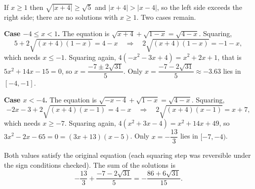 If $x\ge1$ then $\sqrt{|x+4|}\ge\sqrt5$ and $|x+4|>|x-4|$, so the left side exceeds the right side; there are no solutions with $x\ge1$. Two cases remain.

\textbf{Case $-4\le x<1$.} The equation is $\sqrt{x+4}+\sqrt{1-x}=\sqrt{4-x}$. Squaring,
\[
5+2\sqrt{(x+4)(1-x)}=4-x\quad\Longrightarrow\quad 2\sqrt{(x+4)(1-x)}=-1-x,
\]
which needs $x\le-1$. Squaring again, $4(-x^2-3x+4)=x^2+2x+1$, that is $5x^2+14x-15=0$, so $x=\dfrac{-7\pm2\sqrt{31}}{5}$. Only $x=\dfrac{-7-2\sqrt{31}}{5}\approx-3.63$ lies in $[-4,-1]$.

\textbf{Case $x<-4$.} The equation is $\sqrt{-x-4}+\sqrt{1-x}=\sqrt{4-x}$. Squaring,
\[
-2x-3+2\sqrt{(x+4)(x-1)}=4-x\quad\Longrightarrow\quad 2\sqrt{(x+4)(x-1)}=x+7,
\]
which needs $x\ge-7$. Squaring again, $4(x^2+3x-4)=x^2+14x+49$, so $3x^2-2x-65=0=(3x+13)(x-5)$. Only $x=-\dfrac{13}{3}$ lies in $[-7,-4)$.

Both values satisfy the original equation (each squaring step was reversible under the sign conditions checked). The sum of the solutions is
\[
-\dfrac{13}{3}+\dfrac{-7-2\sqrt{31}}{5}=\boxed{-\dfrac{86+6\sqrt{31}}{15}}.
\]
